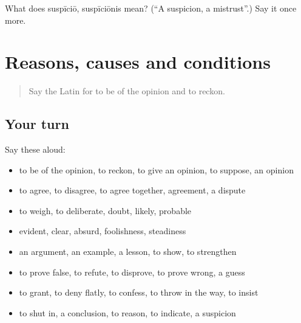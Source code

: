 \begin{tcolorbox}[breakable,colback=teal!4,colframe=teal!35!black,title={Before you move on}]
What does suspīciō, suspīciōnis mean? (\textquotedblleft{}A suspicion, a mistrust\textquotedblright{}.) Say it once more.
\end{tcolorbox}
\section[(dialogue)]{Reasons, causes and conditions}

\label{lesson:LA-R364-review-357-364}



\begin{quote}
Say the Latin for to be of the opinion and to reckon.
\end{quote}

\subsection*{Your turn}
Say these aloud:

\begin{itemize}
\raggedright
  \item to be of the opinion, to reckon, to give an opinion, to suppose, an opinion
  \item to agree, to disagree, to agree together, agreement, a dispute
  \item to weigh, to deliberate, doubt, likely, probable
  \item evident, clear, absurd, foolishness, steadiness
  \item an argument, an example, a lesson, to show, to strengthen
  \item to prove false, to refute, to disprove, to prove wrong, a guess
  \item to grant, to deny flatly, to confess, to throw in the way, to insist
  \item to shut in, a conclusion, to reason, to indicate, a suspicion
\end{itemize}

